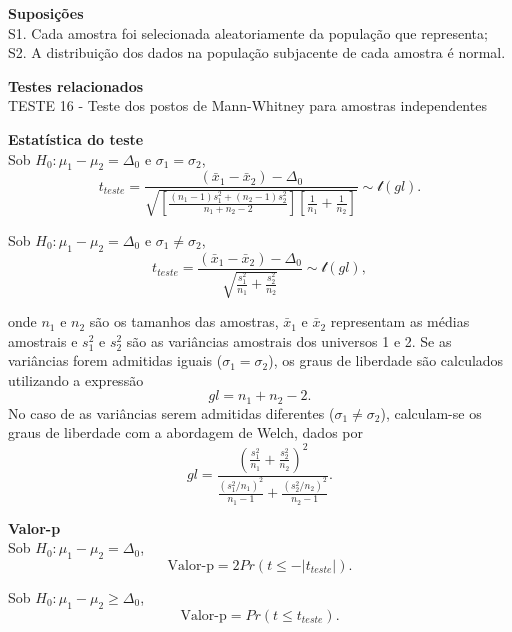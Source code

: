 \documentclass[
]{book}
\theoremstyle{definition}
\theoremstyle{definition}
\theoremstyle{definition}
\theoremstyle{remark}
\begin{document}
\textbf{Suposições}\\
S1. Cada amostra foi selecionada aleatoriamente da população que representa;\\
S2. A distribuição dos dados na população subjacente de cada amostra é normal.

\textbf{Testes relacionados}\\
TESTE 16 - Teste dos postos de Mann-Whitney para amostras independentes

\textbf{Estatística do teste}\\
Sob \(H_0: \mu_1-\mu_2 = \Delta_0\) e \(\sigma_1 = \sigma_2\),
\begin{equation}
t_{teste} = \frac{(\bar{x}_1-\bar{x}_2) - \Delta_0}{\sqrt{\left[ \frac{(n_1-1)s_1^2 + (n_2-1)s_2^2}{n_1+n_2-2} \right] \left[ \frac{1}{n_1}+\frac{1}{n_2} \right]}} \sim \mathcal{t}(gl).
\label{eq:t-teste-media-bi-vars-iguais}
\end{equation}

Sob \(H_0: \mu_1-\mu_2 = \Delta_0\) e \(\sigma_1 \ne \sigma_2\),
\begin{equation}
t_{teste} = \frac{(\bar{x}_1-\bar{x}_2) - \Delta_0}{\sqrt{\frac{s_1^2}{n_1} + \frac{s_2^2}{n_2}}} \sim \mathcal{t}(gl),
\label{eq:t-teste-media-bi-vars-dif}
\end{equation}

onde \(n_1\) e \(n_2\) são os tamanhos das amostras, \(\bar{x}_1\) e \(\bar{x}_2\) representam as médias amostrais e \(s_1^2\) e \(s_2^2\) são as variâncias amostrais dos universos 1 e 2. Se as variâncias forem admitidas iguais (\(\sigma_1 = \sigma_2\)), os graus de liberdade são calculados utilizando a expressão \[gl = n_1 + n_2-2.\] No caso de as variâncias serem admitidas diferentes (\(\sigma_1 \ne \sigma_2\)), calculam-se os graus de liberdade com a abordagem de Welch, dados por \[gl = \frac{\left( \frac{s_1^2}{n_1} + \frac{s_2^2}{n_2} \right)^2}{ \frac{(s_1^2/n_1)^2}{n_1-1} + \frac{(s_2^2/n_2)^2}{n_2-1}}.\]

\textbf{Valor-p}\\
Sob \(H_0: \mu_1-\mu_2 = \Delta_0\),
\begin{equation}
\text{Valor-p} = 2Pr(t \le -|t_{teste}|).
\label{eq:t-teste-media-bi-p-bi}
\end{equation}

Sob \(H_0: \mu_1-\mu_2 \ge \Delta_0\),
\begin{equation}
\text{Valor-p} = Pr(t \le t_{teste}).
\label{eq:t-teste-media-bi-p-uni-inf}
\end{equation}
\end{document}
